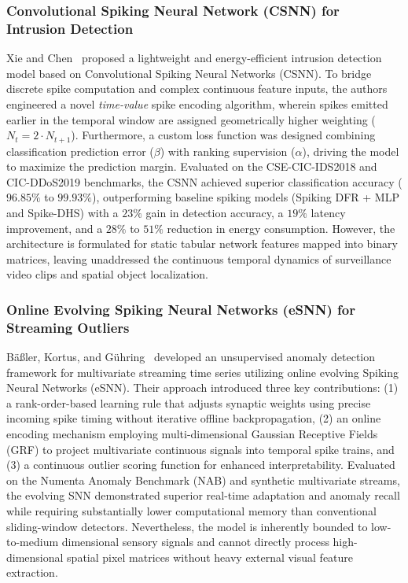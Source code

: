 \documentclass[12pt,a4paper]{report}
\begin{document}
\subsubsection{Convolutional Spiking Neural Network (CSNN) for Intrusion Detection}
Xie and Chen~\cite{ref_xie2024_csnn} proposed a lightweight and energy-efficient intrusion detection model based on Convolutional Spiking Neural Networks (CSNN). To bridge discrete spike computation and complex continuous feature inputs, the authors engineered a novel \textit{time-value} spike encoding algorithm, wherein spikes emitted earlier in the temporal window are assigned geometrically higher weighting ($N_t = 2 \cdot N_{t+1}$). Furthermore, a custom loss function was designed combining classification prediction error ($\beta$) with ranking supervision ($\alpha$), driving the model to maximize the prediction margin. Evaluated on the CSE-CIC-IDS2018 and CIC-DDoS2019 benchmarks, the CSNN achieved superior classification accuracy ($96.85\%$ to $99.93\%$), outperforming baseline spiking models (Spiking DFR + MLP and Spike-DHS) with a $23\%$ gain in detection accuracy, a $19\%$ latency improvement, and a $28\%$ to $51\%$ reduction in energy consumption. However, the architecture is formulated for static tabular network features mapped into binary matrices, leaving unaddressed the continuous temporal dynamics of surveillance video clips and spatial object localization.

\subsubsection{Online Evolving Spiking Neural Networks (eSNN) for Streaming Outliers}
B{\"a}{\ss}ler, Kortus, and G{\"u}hring~\cite{ref_bassler2022_esnn} developed an unsupervised anomaly detection framework for multivariate streaming time series utilizing online evolving Spiking Neural Networks (eSNN). Their approach introduced three key contributions: (1) a rank-order-based learning rule that adjusts synaptic weights using precise incoming spike timing without iterative offline backpropagation, (2) an online encoding mechanism employing multi-dimensional Gaussian Receptive Fields (GRF) to project multivariate continuous signals into temporal spike trains, and (3) a continuous outlier scoring function for enhanced interpretability. Evaluated on the Numenta Anomaly Benchmark (NAB) and synthetic multivariate streams, the evolving SNN demonstrated superior real-time adaptation and anomaly recall while requiring substantially lower computational memory than conventional sliding-window detectors. Nevertheless, the model is inherently bounded to low-to-medium dimensional sensory signals and cannot directly process high-dimensional spatial pixel matrices without heavy external visual feature extraction.
\end{document}
